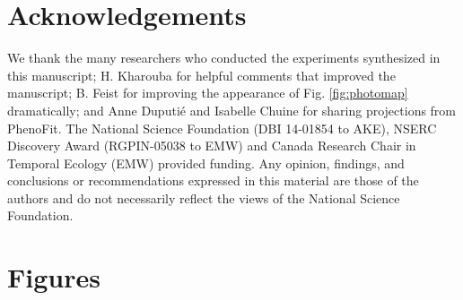 \documentclass{article}
\begin{document}
\section*{Acknowledgements}
We thank the many researchers who conducted the experiments synthesized in this manuscript; H. Kharouba for helpful comments that improved the manuscript; B. Feist for improving the appearance of Fig. \ref{fig:photomap} dramatically; and Anne Duputi\'e and Isabelle Chuine for sharing projections from PhenoFit. The National Science Foundation (DBI 14-01854 to AKE), NSERC Discovery Award (RGPIN-05038 to EMW) and Canada Research Chair in Temporal Ecology (EMW) provided funding. Any opinion, findings, and conclusions or recommendations expressed in this material are those of the authors and do not necessarily reflect the views of the National Science Foundation.

\clearpage


\section* {Figures}
\end{document}

